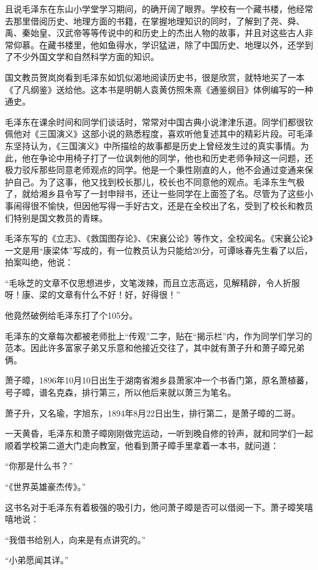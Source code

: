 \documentclass[../../dazhuan.tex]{subfiles}
\begin{document}
且说毛泽东在东山小学堂学习期间，的确开阔了眼界。学校有一个藏书楼，他经常去那里借阅历史、地理方面的书籍，在掌握地理知识的同时，了解到了尧、舜、禹、秦始皇、汉武帝等等传说中的和历史上的杰出人物的故事，并且对这些古人非常仰慕。在藏书楼里，他如鱼得水，学识猛进，除了中国历史、地理以外，还学到了不少外国文学和自然科学方面的知识。

国文教员贺岚岗看到毛泽东如饥似渴地阅读历史书，很是欣赏，就特地买了一本《了凡纲鉴》送给他。这本书是明朝人袁黄仿照朱熹《通鉴纲目》体例编写的一种通史。

毛泽东在课余时间和同学们谈话时，常常对中国古典小说津津乐道。同学们都很钦佩他对《三国演义》这部小说的熟悉程度，喜欢听他复述其中的精彩片段。可毛泽东坚持认为，《三国演义》中所描绘的故事都是历史上曾经发生过的真实事情。为此，他在争论中用椅子打了一位讽刺他的同学，他也和历史老师争辩这一问题，还极力驳斥那些同意老师观点的同学。他是一个秉性刚直的人，他不会通过变通来保护自己。为了这事，他又找到校长那儿，校长也不同意他的观点。毛泽东生气极了，就给湘乡县令写了一封申辩书，还让一些同学在上面签了名。尽管为了这些小事闹得很不愉快，但因他写得一手好古文，还是在全校出了名，受到了校长和教员们特别是国文教员的青睐。

毛泽东写的《立志》、《救国图存论》、《宋襄公论》等作文，全校闻名。《宋襄公论》一文是用“康梁体”写成的，有一位教员认为只能给20分，可谭咏春先生看了以后，拍案叫绝，他说：

“毛咏芝的文章不仅思想进步，文笔泼辣，而且立志高远，见解精辟，令人折服呀！康、梁的文章有什么不好！好，好得很！”

他竟然破例给毛泽东打了个105分。

毛泽东的文章每次都被老师批上“传观”二字，贴在“揭示栏”内，作为同学们学习的范本。因此许多富家子弟又乐意和他接近交往了，其中就有萧子升和萧子暲兄弟俩。

萧子暲，1896年10月10日出生于湖南省湘乡县萧家冲一个书香门第，原名萧植蕃，号子暲，谱名克森，排行第三，所以他后来就以萧三为笔名。

萧子升，又名瑜，字旭东，1894年8月22日出生，排行第二，是萧子暲的二哥。

一天黄昏，毛泽东和萧子暲刚刚做完运动，一听到晚自修的铃声，就和同学们一起顺着学校第二道大门走向教室，他看到萧子暲手里拿着一本书，就问道：

“你那是什么书？”

“《世界英雄豪杰传》。”

这书名对于毛泽东有着极强的吸引力，他问萧子暲是否可以借阅一下。萧子暲笑嘻嘻地说：

“我借书给别人，向来是有点讲究的。”

“小弟愿闻其详。”
\end{document}
